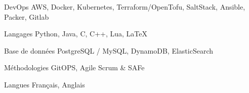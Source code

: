 

\begin{cvskills}

  \cvskill
    {DevOps} %
    {AWS, Docker, Kubernetes, Terraform/OpenTofu, SaltStack, Ansible, Packer, Gitlab} %

  \cvskill
    {Langages} %
    {Python, Java, C, C++, Lua, LaTeX} %

  \cvskill
    {Base de données} %
    {PostgreSQL / MySQL, DynamoDB, ElasticSearch} %

  \cvskill
    {Méthodologies} %
    {GitOPS, Agile Scrum \& SAFe} %

  \cvskill
    {Langues} %
    {Français, Anglais} %

\end{cvskills}
